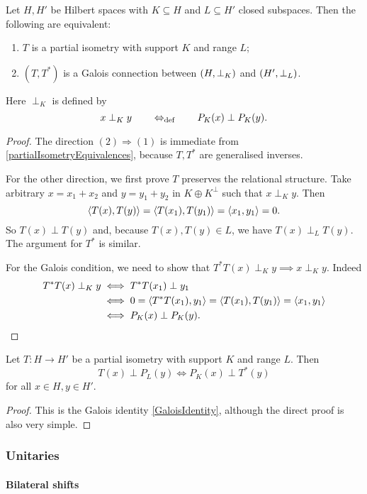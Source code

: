 \begin{proposition}
Let $H,H'$ be Hilbert spaces with $K\subseteq H$ and $L\subseteq H'$ closed subspaces. Then the following are equivalent:
\begin{enumerate}
\item $T$ is a partial isometry with support $K$ and range $L$;
\item $(T,T^*)$ is a Galois connection between $\sSet{H, \perp_K}$ and $\sSet{H', \perp_L}$.
\end{enumerate}
Here $\perp_K$ is defined by
\[ x \perp_K y \quad\quad\Leftrightarrow_{\text{def}}\quad\quad P_K(x)\perp P_{K}(y). \]
\end{proposition}
\begin{proof}
The direction $(2) \Rightarrow (1)$ is immediate from \ref{partialIsometryEquivalences}, because $T,T^*$ are generalised inverses.

For the other direction, we first prove $T$ preserves the relational structure. Take arbitrary $x= x_1+x_2$ and $y=y_1+y_2$ in $K\oplus K^\perp$ such that $x\perp_K y$. Then
\[ \left\langle T(x), T(y) \right\rangle = \left\langle T(x_1), T(y_1) \right\rangle = \left\langle x_1, y_1 \right\rangle = 0. \]
So $T(x)\perp T(y)$ and, because $T(x), T(y) \in L$, we have $T(x)\perp_L T(y)$. The argument for $T^*$ is similar.

For the Galois condition, we need to show that $T^*T(x)\perp_K y \implies x\perp_K y$. Indeed
\begin{align*}
T^*T(x)\perp_K y &\iff T^*T(x_1)\perp y_1 \\
&\iff 0= \left\langle T^*T(x_1), y_1 \right\rangle = \left\langle T(x_1), T(y_1) \right\rangle = \left\langle x_1,y_1 \right\rangle \\
&\iff P_K(x)\perp P_K(y).
\end{align*}
\end{proof}
\begin{corollary}
Let $T: H\to H'$ be a partial isometry with support $K$ and range $L$. Then
\[ T(x) \perp P_L(y) \iff P_K(x) \perp T^*(y) \]
for all $x\in H, y\in H'$.
\end{corollary}
\begin{proof}
This is the Galois identity \ref{GaloisIdentity}, although the direct proof is also very simple.
\end{proof}

\subsubsection{Unitaries}
\paragraph{Bilateral shifts}



